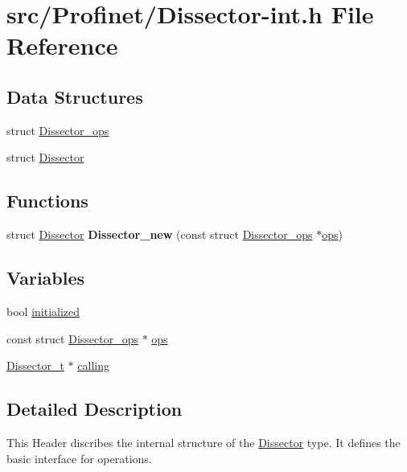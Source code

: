\hypertarget{_dissector-int_8h}{}\section{src/\+Profinet/\+Dissector-\/int.h File Reference}
\label{_dissector-int_8h}
\subsection*{Data Structures}
\begin{DoxyCompactItemize}
\item 
struct \hyperlink{struct_dissector__ops}{Dissector\+\_\+ops}
\item 
struct \hyperlink{struct_dissector}{Dissector}
\end{DoxyCompactItemize}
\subsection*{Functions}
\begin{DoxyCompactItemize}
\item 
\hypertarget{_dissector-int_8h_a1f86fa64cdcde33d837d1e252b187ef9}{}struct \hyperlink{struct_dissector}{Dissector} {\bfseries Dissector\+\_\+new} (const struct \hyperlink{struct_dissector__ops}{Dissector\+\_\+ops} $\ast$\hyperlink{_dissector-int_8h_aa1af82d23bc82742dafc141b0f4d5229}{ops})\label{_dissector-int_8h_a1f86fa64cdcde33d837d1e252b187ef9}

\end{DoxyCompactItemize}
\subsection*{Variables}
\begin{DoxyCompactItemize}
\item 
bool \hyperlink{_dissector-int_8h_aedeffc7d23da25d52b9a50045189fe2b}{initialized}
\item 
const struct \hyperlink{struct_dissector__ops}{Dissector\+\_\+ops} $\ast$ \hyperlink{_dissector-int_8h_aa1af82d23bc82742dafc141b0f4d5229}{ops}
\item 
\hyperlink{struct_dissector}{Dissector\+\_\+t} $\ast$ \hyperlink{_dissector-int_8h_a2f297b2d3abad7c440c176d51e011f38}{calling}
\end{DoxyCompactItemize}


\subsection{Detailed Description}
This Header discribes the internal structure of the \hyperlink{struct_dissector}{Dissector} type. It defines the basic interface for operations. 

